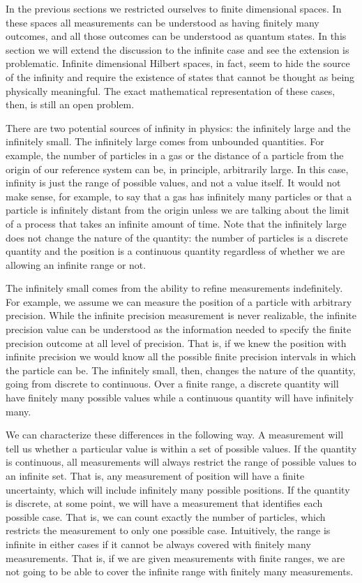 In the previous sections we restricted ourselves to finite dimensional spaces. In these spaces all measurements can be understood as having finitely many outcomes, and all those outcomes can be understood as quantum states. In this section we will extend the discussion to the infinite case and see the extension is problematic. Infinite dimensional Hilbert spaces, in fact, seem to hide the source of the infinity and require the existence of states that cannot be thought as being physically meaningful. The exact mathematical representation of these cases, then, is still an open problem.

There are two potential sources of infinity in physics: the infinitely large and the infinitely small. The infinitely large comes from unbounded quantities. For example, the number of particles in a gas or the distance of a particle from the origin of our reference system can be, in principle, arbitrarily large. In this case, infinity is just the range of possible values, and not a value itself. It would not make sense, for example, to say that a gas has infinitely many particles or that a particle is infinitely distant from the origin unless we are talking about the limit of a process that takes an infinite amount of time. Note that the infinitely large does not change the nature of the quantity: the number of particles is a discrete quantity and the position is a continuous quantity regardless of whether we are allowing an infinite range or not.

The infinitely small comes from the ability to refine measurements indefinitely. For example, we assume we can measure the position of a particle with arbitrary precision. While the infinite precision measurement is never realizable, the infinite precision value can be understood as the information needed to specify the finite precision outcome at all level of precision. That is, if we knew the position with infinite precision we would know all the possible finite precision intervals in which the particle can be. The infinitely small, then, changes the nature of the quantity, going from discrete to continuous. Over a finite range, a discrete quantity will have finitely many possible values while a continuous quantity will have infinitely many.

We can characterize these differences in the following way. A measurement will tell us whether a particular value is within a set of possible values. If the quantity is continuous, all measurements will always restrict the range of possible values to an infinite set. That is, any measurement of position will have a finite uncertainty, which will include infinitely many possible positions. If the quantity is discrete, at some point, we will have a measurement that identifies each possible case. That is, we can count exactly the number of particles, which restricts the measurement to only one possible case. Intuitively, the range is infinite in either cases if it cannot be always covered with finitely many measurements. That is, if we are given measurements with finite ranges, we are not going to be able to cover the infinite range with finitely many measurements.

